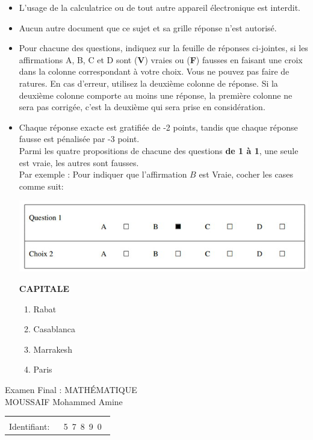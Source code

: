 \documentclass{book}%
\begin{document}
\begin{itemize}%
\item%
L'usage de la calculatrice ou de tout autre appareil électronique est interdit.%
\item%
Aucun autre document que ce sujet et sa grille réponse n'est autorisé.%
\item%
Pour chacune des questions, indiquez sur la feuille de réponses ci-jointes, si les affirmations A, B, C et D sont (\textbf{V}) vraies ou (\textbf{F}) fausses en faisant une croix dans la colonne correspondant à votre choix. Vous ne pouvez pas faire de ratures. En cas d'erreur, utilisez la deuxième colonne de réponse. Si la deuxième colonne comporte au moins une réponse, la première colonne ne sera pas corrigée, c'est la deuxième qui sera prise en considération.%
\item%
Chaque réponse exacte est gratifiée de -2 points, tandis que chaque réponse fausse est pénalisée par -3 point. \\ 	Parmi les quatre propositions de chacune des questions \textbf{de 1 à 1}, une seule est vraie, les autres sont fausses. \\ 	Par exemple : Pour indiquer que l'affirmation $B$ est Vraie, cocher les cases comme suit:  \\ \begin{center}	\includegraphics[scale=0.8]{reponses.png} \end{center}%
\thispagestyle{empty}%
\begin{exercise}%
\textbf{CAPITALE }%
\begin{enumerate}[label=\textbf{\Alph*. }]%
\item%
Rabat%
\item%
Casablanca%
\item%
Marrakesh%
\item%
Paris%
\end{enumerate}%
\end{exercise}%
\end{itemize}%
\newpage%
\thispagestyle{empty}%
Examen Final : MATHÉMATIQUE $\qquad \qquad \qquad \qquad \qquad \qquad \qquad \qquad$ MOUSSAIF Mohammed Amine%
\begin{flushright}%
\begin{tabular}{|l|}%
\hline%
 \\%
\thispagestyle{empty}%
Identifiant: $\quad$ {\Large 5~7~8~9~0~}%
 \\%
\hline%
\end{tabular}%
\end{flushright}%
\end{document}
